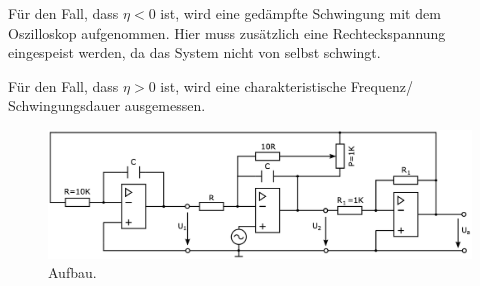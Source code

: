 Für den Fall, dass $\eta < 0$ ist, wird eine gedämpfte Schwingung mit dem Oszilloskop aufgenommen. Hier muss zusätzlich eine Rechteckspannung eingespeist werden, da das System nicht von selbst schwingt.

Für den Fall, dass $\eta > 0$ ist, wird eine charakteristische Frequenz/ Schwingungsdauer ausgemessen.

\begin{figure}
    \centering
    \includegraphics[width=0.7\linewidth]{./figures/6_VarAmp.png}
    \caption{Aufbau. \cite{Anleitung}}
    \label{fig:VarAmp}
\end{figure}